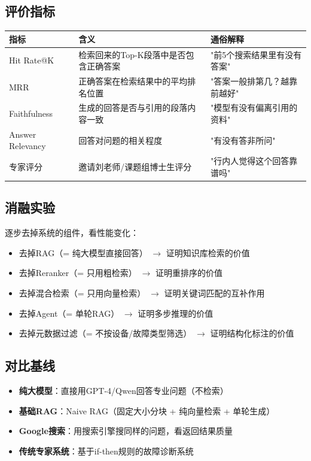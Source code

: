 \documentclass[a4paper, 11pt]{ctexart}
\begin{document}
\subsection{评价指标}

\begin{table}[H]
\centering
\renewcommand{\arraystretch}{1.2}
\small
\begin{tabular}{p{3cm} p{4cm} p{5.5cm}}
    \toprule
    \textbf{指标} & \textbf{含义} & \textbf{通俗解释} \\
    \midrule
    Hit Rate@K & 检索回来的Top-K段落中是否包含正确答案 & "前5个搜索结果里有没有答案" \\
    MRR & 正确答案在检索结果中的平均排名位置 & "答案一般排第几？越靠前越好" \\
    Faithfulness & 生成的回答是否与引用的段落内容一致 & "模型有没有偏离引用的资料" \\
    Answer Relevancy & 回答对问题的相关程度 & "有没有答非所问" \\
    专家评分 & 邀请刘老师/课题组博士生评分 & "行内人觉得这个回答靠谱吗" \\
    \bottomrule
\end{tabular}
\end{table}

\subsection{消融实验}

逐步去掉系统的组件，看性能变化：
\begin{itemize}
    \item 去掉RAG（= 纯大模型直接回答） $\to$ 证明知识库检索的价值
    \item 去掉Reranker（= 只用粗检索） $\to$ 证明重排序的价值
    \item 去掉混合检索（= 只用向量检索） $\to$ 证明关键词匹配的互补作用
    \item 去掉Agent（= 单轮RAG） $\to$ 证明多步推理的价值
    \item 去掉元数据过滤（= 不按设备/故障类型筛选） $\to$ 证明结构化标注的价值
\end{itemize}

\subsection{对比基线}

\begin{itemize}
    \item \textbf{纯大模型}：直接用GPT-4/Qwen回答专业问题（不检索）
    \item \textbf{基础RAG}：Naive RAG（固定大小分块 + 纯向量检索 + 单轮生成）
    \item \textbf{Google搜索}：用搜索引擎搜同样的问题，看返回结果质量
    \item \textbf{传统专家系统}：基于if-then规则的故障诊断系统
\end{itemize}
\end{document}
